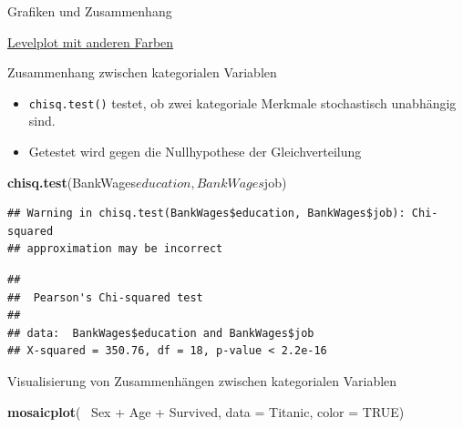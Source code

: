 \documentclass[ignorenonframetext,]{beamer}
\newenvironment{Shaded}{}{}
\newcommand{\KeywordTok}[1]{\textcolor[rgb]{0.00,0.44,0.13}{\textbf{{#1}}}}
\newcommand{\DataTypeTok}[1]{\textcolor[rgb]{0.56,0.13,0.00}{{#1}}}
\newcommand{\StringTok}[1]{\textcolor[rgb]{0.25,0.44,0.63}{{#1}}}
\newcommand{\OtherTok}[1]{\textcolor[rgb]{0.00,0.44,0.13}{{#1}}}
\newcommand{\NormalTok}[1]{{#1}}
\providecommand{\tightlist}{%
\setlength{\itemsep}{0pt}\setlength{\parskip}{0pt}}
\begin{document}
\begin{frame}[fragile]{Grafiken und Zusammenhang}
\begin{block}{\href{http://r.789695.n4.nabble.com/adjusting-levelplot-color-scale-to-data-td3997342.html}{Levelplot
mit anderen Farben}}
\end{block}

\begin{block}{Zusammenhang zwischen kategorialen Variablen}

\begin{itemize}
\tightlist
\item
  \texttt{chisq.test()} testet, ob zwei kategoriale Merkmale
  stochastisch unabhängig sind.
\item
  Getestet wird gegen die Nullhypothese der Gleichverteilung
\end{itemize}

\begin{Shaded}
\begin{Highlighting}[]
\KeywordTok{chisq.test}\NormalTok{(BankWages$education,BankWages$job)}
\end{Highlighting}
\end{Shaded}

\begin{verbatim}
## Warning in chisq.test(BankWages$education, BankWages$job): Chi-squared
## approximation may be incorrect
\end{verbatim}

\begin{verbatim}
## 
##  Pearson's Chi-squared test
## 
## data:  BankWages$education and BankWages$job
## X-squared = 350.76, df = 18, p-value < 2.2e-16
\end{verbatim}

\end{block}

\begin{block}{Visualisierung von Zusammenhängen zwischen kategorialen
Variablen}

\begin{Shaded}
\begin{Highlighting}[]
\KeywordTok{mosaicplot}\NormalTok{(~}\StringTok{ }\NormalTok{Sex +}\StringTok{ }\NormalTok{Age +}\StringTok{ }\NormalTok{Survived, }
           \DataTypeTok{data =} \NormalTok{Titanic, }\DataTypeTok{color =} \OtherTok{TRUE}\NormalTok{)}
\end{Highlighting}
\end{Shaded}


\end{block}
\end{frame}
\end{document}
